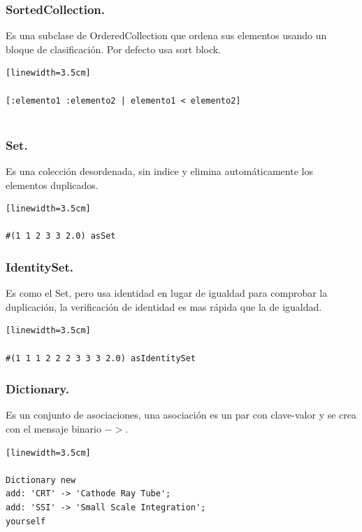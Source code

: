 \documentclass[10pt,journal,compsoc]{IEEEtran}
\begin{document}
\subsubsection{SortedCollection.}
Es una subclase de OrderedCollection que ordena sus elementos usando un bloque de clasificaci\'on. Por defecto usa sort block.
\begin{lstlisting}[language=Smalltalk, caption = {Bloque para ordenar elementos.}][linewidth=3.5cm]

[:elemento1 :elemento2 | elemento1 < elemento2]
        
\end{lstlisting}
\subsubsection{Set.}
Es una colecci\'on desordenada, sin indice y elimina autom\'aticamente los elementos duplicados.
\begin{lstlisting}[language=Smalltalk, caption = {Ejemplo para convertir a un Set.}][linewidth=3.5cm]

#(1 1 2 3 3 2.0) asSet

\end{lstlisting}
\subsubsection{IdentitySet.}
Es como el Set, pero usa identidad en lugar de igualdad para comprobar la duplicaci\'on, la verificaci\'on de identidad es mas r\'apida que la de igualdad.
\begin{lstlisting}[language=Smalltalk, caption = {Ejemplo para convertir a IdentitySet.}][linewidth=3.5cm]

#(1 1 1 2 2 2 3 3 3 2.0) asIdentitySet

\end{lstlisting}

\subsubsection{Dictionary.}
Es un conjunto de asociaciones, una asociaci\'on es un par con clave-valor y se crea con el mensaje binario $->$.
\begin{lstlisting}[language=Smalltalk, caption = {Ejemplo para agregar a un diccionario.}][linewidth=3.5cm]

Dictionary new
add: 'CRT' -> 'Cathode Ray Tube';
add: 'SSI' -> 'Small Scale Integration';
yourself

\end{lstlisting}
\end{document}

